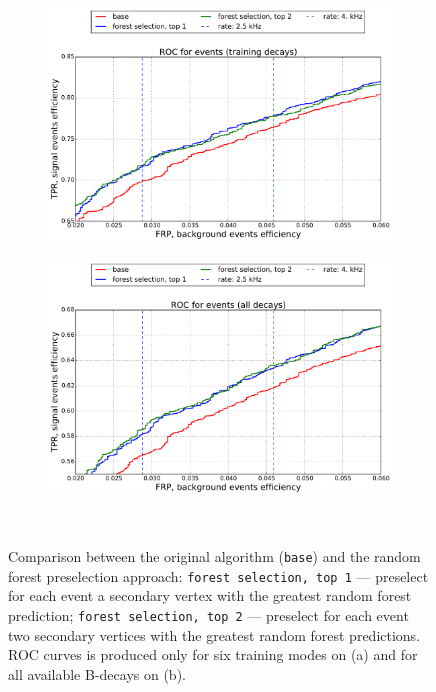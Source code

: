 \documentclass{llncs}
\begin{document}
\begin{figure}
	\begin{center}
    	\begin{subfigure}[b]{0.45\textwidth}
    		\includegraphics[width=\textwidth]{../../img/roc_training_top} \caption{}
    	\end{subfigure} %
    	\begin{subfigure}[b]{0.45\textwidth}
    		\includegraphics[width=\textwidth]{../../img/roc_all_top} \caption{} %
    	\end{subfigure}
    \end{center}
  \caption{Comparison between the original algorithm (\texttt{base}) and the random forest preselection approach: \texttt{forest selection, top 1} --- preselect for each event a secondary vertex with the greatest random forest prediction; \texttt{forest selection, top 2} --- preselect for each event two secondary vertices with the greatest random forest predictions. ROC curves is produced only for six training modes on (a) and for all available B-decays on (b).}~\label{fig:forest_simple}
\end{figure}
\end{document}
